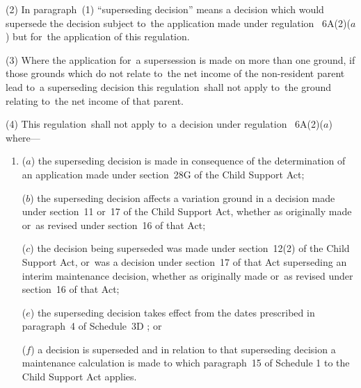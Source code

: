 \documentclass[12pt,a4paper]{article}
\begin{document}
(2) In paragraph~(1) “superseding decision” means a decision which would supersede the decision subject to~the application made under regulation~%
6A(2)($a$)  %
but for~the application of this regulation.


(3) Where the application for~a supersession is made on more than one ground, if those grounds which do not relate to~the net income of the non-resident parent lead to~a superseding decision this regulation~shall not apply to~the ground relating to~the net income of that parent.

(4) This regulation~shall not apply to~a decision under regulation~%
6A(2)($a$)  %
where—
\begin{enumerate}\item[]
($a$) the superseding decision is made in consequence of the determination of an application made under section~28G of the Child Support Act;

($b$) the superseding decision affects a variation ground in a decision made under section~11 or~17 of the Child Support Act, whether as originally made or~as revised under section~16 of that Act;

($c$) the decision being superseded was made under section~12(2) of the Child Support Act, or~was a decision under section~17 of that Act superseding an interim maintenance decision, whether as originally made or~as revised under section~16 of that Act;
%

($e$) the superseding decision takes effect from the dates prescribed in 
paragraph~4 of Schedule~3D%
% 
; or

($f$) a decision is superseded and in relation to that superseding decision a maintenance calculation is made to which paragraph~15 of Schedule 1 to the Child Support Act applies.
\end{enumerate}
\end{document}
